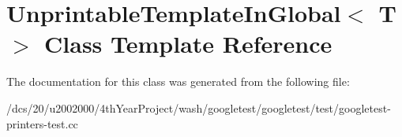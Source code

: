 \hypertarget{classUnprintableTemplateInGlobal}{}\section{Unprintable\+Template\+In\+Global$<$ T $>$ Class Template Reference}
\label{classUnprintableTemplateInGlobal}


The documentation for this class was generated from the following file\+:\begin{DoxyCompactItemize}
\item 
/dcs/20/u2002000/4th\+Year\+Project/wash/googletest/googletest/test/googletest-\/printers-\/test.\+cc\end{DoxyCompactItemize}
